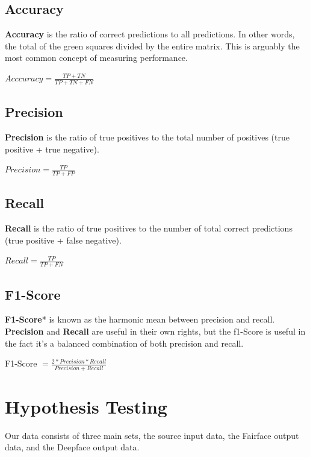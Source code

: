 \documentclass[
  letterpaper,
  DIV=11,
  numbers=noendperiod]{scrreprt}
\begin{document}
\hypertarget{accuracy}{%
\subsection{Accuracy}\label{accuracy}}

\textbf{Accuracy} is the ratio of correct predictions to all
predictions. In other words, the total of the green squares divided by
the entire matrix. This is arguably the most common concept of measuring
performance.

\(Acccuracy = \frac{TP+TN}{TP + TN + FN}\)

\hypertarget{precision}{%
\subsection{Precision}\label{precision}}

\textbf{Precision} is the ratio of true positives to the total number of
positives (true positive + true negative).

\(Precision = \frac{TP}{TP+FP}\)

\hypertarget{recall}{%
\subsection{Recall}\label{recall}}

\textbf{Recall} is the ratio of true positives to the number of total
correct predictions (true positive + false negative).

\(Recall = \frac{TP}{TP+FN}\)

\hypertarget{f1-score}{%
\subsection{F1-Score}\label{f1-score}}

\textbf{F1-Score}* is known as the harmonic mean between precision and
recall. \textbf{Precision} and \textbf{Recall} are useful in their own
rights, but the f1-Score is useful in the fact it's a balanced
combination of both precision and recall.

F1-Score \(= \frac{2 * Precision * Recall}{Precision + Recall}\)

\hypertarget{hypothesis-testing}{%
\section{Hypothesis Testing}\label{hypothesis-testing}}

Our data consists of three main sets, the source input data, the
Fairface output data, and the Deepface output data.
\end{document}
